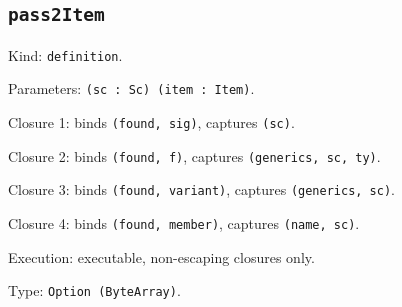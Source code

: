 \documentclass[11pt]{article}
\begin{document}
\subsection*{\texttt{pass2Item}}
\noindent Kind: \texttt{definition}.\par
\noindent Parameters: \texttt{(sc : Sc) (item : Item)}.\par
\noindent Closure 1: binds \texttt{(found, sig)}, captures \texttt{(sc)}.\par
\noindent Closure 2: binds \texttt{(found, f)}, captures \texttt{(generics, sc, ty)}.\par
\noindent Closure 3: binds \texttt{(found, variant)}, captures \texttt{(generics, sc)}.\par
\noindent Closure 4: binds \texttt{(found, member)}, captures \texttt{(name, sc)}.\par
\noindent Execution: executable, non-escaping closures only.\par
\noindent Type: \texttt{Option (ByteArray)}.\par
\end{document}
